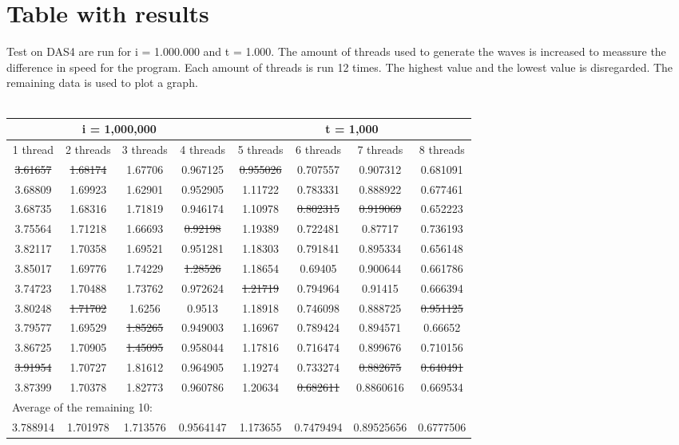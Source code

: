 \documentclass[a4paper]{article}
\begin{document}
  \section{Table with results}
    Test on DAS4 are run for i = 1.000.000 and t = 1.000.
    The amount of threads used to generate the waves is increased to meassure the
    difference in speed for the program.
    Each amount of threads is run 12 times. 
    The highest value and the lowest value is disregarded. 
    The remaining data is used to plot a graph.\\\\
    \begin{tabular}{|c | c | c | c | c | c | c | c |}
      \hline
      \multicolumn{4}{|c}{i = 1,000,000} & \multicolumn{4}{c|}{t = 1,000}\\
      \hline
      1 thread & 2 threads & 3 threads & 4 threads & 5 threads & 6 threads & 7 threads & 8 threads\\
      \hline
      \st{3.61657} & \st{1.68174} & 1.67706 & 0.967125 & \st{0.955026} & 0.707557 & 0.907312 & 0.681091\\
      \hline
      3.68809 & 1.69923 & 1.62901 & 0.952905 & 1.11722 & 0.783331 & 0.888922 & 0.677461\\
      \hline
      3.68735 & 1.68316 & 1.71819 & 0.946174 & 1.10978 & \st{0.802315} & \st{0.919069} & 0.652223\\
      \hline
      3.75564 & 1.71218 & 1.66693 & \st{0.92198} & 1.19389 & 0.722481 & 0.87717 & 0.736193\\
      \hline
      3.82117 & 1.70358 & 1.69521 & 0.951281 & 1.18303 & 0.791841 & 0.895334 & 0.656148\\
      \hline
      3.85017 & 1.69776 & 1.74229 & \st{1.28526} & 1.18654 & 0.69405 & 0.900644 & 0.661786\\
      \hline
      3.74723 & 1.70488 & 1.73762 & 0.972624 & \st{1.21719} & 0.794964 & 0.91415 & 0.666394\\
      \hline
      3.80248 & \st{1.71702} & 1.6256 & 0.9513 & 1.18918 & 0.746098 & 0.888725 & \st{0.951125}\\
      \hline
      3.79577 & 1.69529 & \st{1.85265} & 0.949003 & 1.16967 & 0.789424 & 0.894571 & 0.66652\\
      \hline
      3.86725 & 1.70905 & \st{1.45095} & 0.958044 & 1.17816 & 0.716474 & 0.899676 & 0.710156\\
      \hline
      \st{3.91954} & 1.70727 & 1.81612 & 0.964905 & 1.19274 & 0.733274 & \st{0.882675} & \st{0.640491}\\
      \hline
      3.87399 & 1.70378 & 1.82773 & 0.960786 & 1.20634 & \st{0.682611} & 0.8860616 & 0.669534\\
      \hline
      \multicolumn{8}{|l|}{Average of the remaining 10:}\\
      \hline
      3.788914 & 1.701978 & 1.713576 & 0.9564147 & 1.173655 & 0.7479494 & 0.89525656 & 0.6777506\\
      \hline
    \end{tabular}
\end{document}
